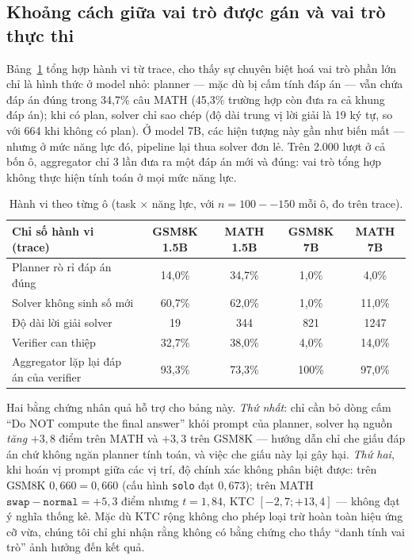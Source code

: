 \documentclass[11pt,a4paper]{article}
\begin{document}
\subsection{Khoảng cách giữa vai trò được gán và vai trò thực thi}\label{sec:roles}

Bảng~\ref{tab:behavior} tổng hợp hành vi từ trace, cho thấy sự chuyên biệt hoá vai trò phần lớn chỉ là hình thức ở model nhỏ: planner --- mặc dù bị cấm tính đáp án --- vẫn chứa đáp án đúng trong 34,7\% câu MATH (45,3\% trường hợp còn đưa ra cả khung đáp án); khi có plan, solver chỉ sao chép (độ dài trung vị lời giải là 19 ký tự, so với 664 khi không có plan). Ở model 7B, các hiện tượng này gần như biến mất --- nhưng ở mức năng lực đó, pipeline lại thua solver đơn lẻ. Trên 2.000 lượt ở cả bốn ô, aggregator chỉ 3 lần đưa ra một đáp án mới và đúng: vai trò tổng hợp không thực hiện tính toán ở mọi mức năng lực.

\begin{table}[h]\centering\small
\begin{tabular}{@{}l c c c c@{}}
\toprule
Chỉ số hành vi (trace) & GSM8K 1.5B & MATH 1.5B & GSM8K 7B & MATH 7B\\
\midrule
Planner rò rỉ đáp án đúng & 14,0\% & 34,7\% & 1,0\% & 4,0\%\\
Solver không sinh số mới & 60,7\% & 62,0\% & 1,0\% & 11,0\%\\
Độ dài lời giải solver & 19 & 344 & 821 & 1247\\
Verifier can thiệp & 32,7\% & 38,0\% & 4,0\% & 14,0\%\\
Aggregator lặp lại đáp án của verifier & 93,3\% & 73,3\% & 100\% & 97,0\%\\
\bottomrule
\end{tabular}
\caption{Hành vi theo từng ô (task $\times$ năng lực, với $n=100--150$ mỗi ô, đo trên trace).}
\label{tab:behavior}
\end{table}

Hai bằng chứng nhân quả hỗ trợ cho bảng này. \emph{Thứ nhất}: chỉ cần bỏ dòng cấm ``Do NOT compute the final answer'' khỏi prompt của planner, solver hạ nguồn \emph{tăng} $+3{,}8$ điểm trên MATH và $+3{,}3$ trên GSM8K --- hướng dẫn chỉ che giấu đáp án chứ không ngăn planner tính toán, và việc che giấu này lại gây hại. \emph{Thứ hai}, khi hoán vị prompt giữa các vị trí, độ chính xác không phân biệt được: trên GSM8K $0{,}660 = 0{,}660$ (cấu hình \texttt{solo} đạt $0{,}673$); trên MATH $\texttt{swap}-\texttt{normal} = +5{,}3$ điểm nhưng $t=1{,}84$, KTC $[-2{,}7;+13{,}4]$ --- không đạt ý nghĩa thống kê. Mặc dù KTC rộng không cho phép loại trừ hoàn toàn hiệu ứng cỡ vừa, chúng tôi chỉ ghi nhận rằng không có bằng chứng cho thấy ``danh tính vai trò'' ảnh hưởng đến kết quả.
\end{document}
